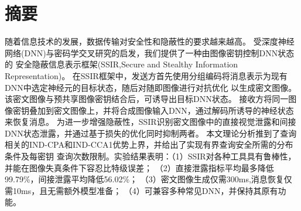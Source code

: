 \clearpage
{}
\pagestyle{plain}
\chapter*{摘要}
随着信息技术的发展，数据传输对安全性和隐蔽性的要求越来越高。
受深度神经网络(DNN)与密码学交叉研究的启发，我们提供了一种由图像密钥控制DNN状态的
安全隐蔽信息表示框架(SSIR,Secure and Stealthy Information Representation)。
在SSIR框架中，发送方首先使用分组编码将消息表示为现有DNN中选定神经元的目标状态，随后对随即图像进行对抗优化
以生成密文图像。该密文图像与预共享图像密钥结合后，可诱导出目标DNN状态。
接收方将同一图像密钥叠加到密文图像上，并将合成图像输入DNN，通过解码所诱导的神经状态来恢复消息。
为进一步增强隐蔽性，SSIR识别密文图像中的直接视觉泄露和间接DNN状态泄露，并通过基于损失的优化同时抑制两者。
本文理论分析推到了查询相关的IND-CPA和IND-CCA1优势上界，并给出了实现有界查询安全所需的分布条件及每密钥
查询次数限制。实验结果表明：（1）SSIR对各种工具具有鲁棒性，并能在图像失真条件下容忍比特级误差；
（2）直接泄露指标平均最多降低99.79\%，间接泄露平均降低56.02\%；
（3）密文图像生成仅需300ms,消息恢复仅需10ms，且无需额外模型准备；
（4）可兼容多种常见DNN，并保持其原有功能。